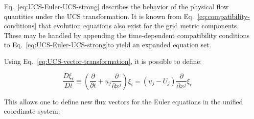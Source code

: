 Eq.~\ref{eq:UCS-Euler-UCS-strong} describes the behavior of the physical flow quantities under the UCS transformation. It is known from Eq.~\ref{eq:compatibility-conditions} that evolution equations also exist for the grid metric components. These may be handled by appending the time-dependent compatibility conditions to Eq.~\ref{eq:UCS-Euler-UCS-strong}to yield an expanded equation set.

Using Eq.~\ref{eq:UCS-vector-transformation}, it is possible to define:

\begin{equation}
\label{eq:UCS-total-grid-derivative}
\frac{{D{\xi _i}}}{{Dt}} \equiv \left( {\frac{\partial }{{\partial t}} + {u_j}\frac{\partial }{{\partial {x^j}}}} \right){\xi _i} = \left( {{u_j} - {U_j}} \right)\frac{\partial }{{\partial {x^j}}}{\xi _i}
\end{equation}

This allows one to define new flux vectors for the Euler equations in the unified coordinate system:

